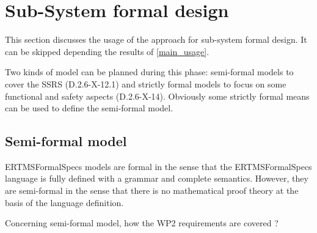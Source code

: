 \section{Sub-System formal design}
This section discusses the usage of the approach for sub-system formal design.
It can be skipped depending the results of \ref{main_usage}.

Two kinds of model can be planned during this phase: semi-formal models to  cover the SSRS (D.2.6-X-12.1) and strictly formal  models to  focus on some functional and safety aspects (D.2.6-X-14). Obviously some strictly  formal means can be used to define the semi-formal  model.

\subsection{Semi-formal model}

\begin{author_comment}
ERTMSFormalSpecs models are formal in the sense that the ERTMSFormalSpecs language is fully defined with a grammar and complete semantics. However, they are semi-formal in the sense that there is no mathematical proof theory at the basis of the language definition.  
\end{author_comment}

Concerning semi-formal model, how the WP2 requirements are covered ?

